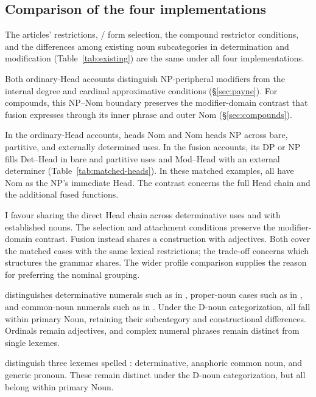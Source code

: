 \documentclass[12pt]{article}
\begin{document}
\subsection{Comparison of the four implementations}\label{sec:costs}

The articles' restrictions, / form selection, the compound restrictor conditions, and the differences among existing noun subcategories in determination and modification (Table~\ref{tab:existing}) are the same under all four implementations.

Both ordinary-Head accounts distinguish NP-peripheral modifiers from the internal degree and cardinal approximative conditions (§\ref{sec:payne}). For compounds, this NP--Nom boundary preserves the modifier-domain contrast that fusion expresses through its inner phrase and outer Nom (§\ref{sec:compounds}).

In the ordinary-Head accounts,  heads Nom and Nom heads NP across bare, partitive, and externally determined uses. In the fusion accounts, its DP or NP fills Det--Head in bare and partitive uses and Mod--Head with an external determiner (Table~\ref{tab:matched-heads}). In these matched examples, all have Nom as the NP's immediate Head. The contrast concerns the full Head chain and the additional fused functions.

I favour sharing the direct Head chain across determinative uses and with established nouns. The selection and attachment conditions preserve the modifier-domain contrast. Fusion instead shares a construction with adjectives. Both cover the matched cases with the same lexical restrictions; the trade-off concerns which structures the grammar shares. The wider profile comparison supplies the reason for preferring the nominal grouping.

\textcite{reynolds2026numerals} distinguishes determinative numerals such as  in , proper-noun cases such as  in , and common-noun numerals such as  in . Under the D-noun categorization, all fall within primary Noun, retaining their subcategory and constructional differences. Ordinals remain adjectives, and complex numeral phrases remain distinct from single lexemes.

\textcite[797--798]{payne2013anaphoric} distinguish three lexemes spelled : determinative, anaphoric common noun, and generic pronoun. These remain distinct under the D-noun categorization, but all belong within primary Noun.
\end{document}
